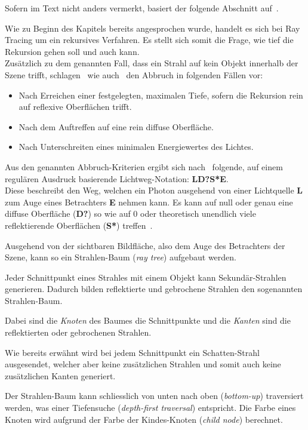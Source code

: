 Sofern im Text nicht anders vermerkt, basiert der folgende Abschnitt
auf~\cite[S. 16 bis 17]{glassner_introduction_1989}.

Wie zu Beginn des Kapitels bereits angesprochen wurde, handelt es sich
bei Ray Tracing um ein rekursives Verfahren. Es stellt sich somit die
Frage, wie tief die Rekursion gehen soll und auch kann.\\
Zusätzlich zu dem genannten Fall, dass ein Strahl auf kein Objekt
innerhalb der Szene trifft, schlagen~\citeauthor{whitted_improved_1980}
wie auch~\citeauthor{glassner_introduction_1989} den Abbruch in
folgenden Fällen vor:
\begin{itemize}
        \item{Nach Erreichen einer festgelegten, maximalen Tiefe},
            sofern die Rekursion rein auf reflexive Oberflächen trifft.
        \item{Nach dem Auftreffen auf eine rein diffuse Oberfläche.}
        \item{Nach Unterschreiten eines minimalen Energiewertes des
                Lichtes.}
\end{itemize}

Aus den genannten Abbruch-Kriterien ergibt sich
nach~\citeauthor{heckbert_adaptive_1990} folgende, auf einem regulären
Ausdruck basierende Lichtweg-Notation: \textbf{LD?S*E}.\\
Diese beschreibt den Weg, welchen ein Photon ausgehend von einer
Lichtquelle \textbf{L} zum Auge eines Betrachters \textbf{E} nehmen
kann. Es kann auf null oder genau eine diffuse Oberfläche (\textbf{D?})
so wie auf 0 oder theoretisch unendlich viele reflektierende Oberflächen
(\textbf{S*}) treffen~\parencite[S. 148]{heckbert_adaptive_1990}.

Ausgehend von der sichtbaren Bildfläche, also dem Auge des Betrachters
der Szene, kann so ein Strahlen-Baum (\textit{ray tree}) aufgebaut
werden.

Jeder Schnittpunkt eines Strahles mit einem Objekt kann
Sekundär-Strahlen generieren. Dadurch bilden reflektierte und gebrochene
Strahlen den sogenannten Strahlen-Baum.

Dabei sind die \textit{Knoten} des Baumes die Schnittpunkte und die
\textit{Kanten} sind die reflektierten oder gebrochenen Strahlen.

Wie bereits erwähnt wird bei jedem Schnittpunkt ein Schatten-Strahl
ausgesendet, welcher aber keine zusätzlichen Strahlen und somit auch
keine zusätzlichen Kanten generiert.

Der Strahlen-Baum kann schliesslich von unten nach oben
(\textit{bottom-up}) traversiert werden, was einer Tiefensuche
(\textit{depth-first traversal}) entspricht. Die Farbe eines Knoten wird aufgrund
der Farbe der Kindes-Knoten (\textit{child node}) berechnet.

